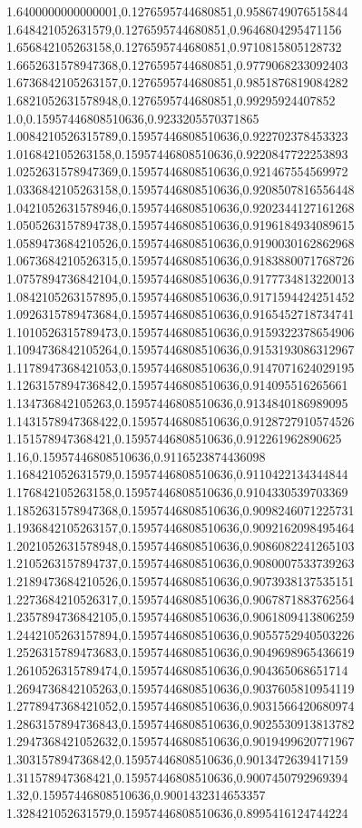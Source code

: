 1.6400000000000001,0.1276595744680851,0.9586749076515844
1.648421052631579,0.1276595744680851,0.9646804295471156
1.656842105263158,0.1276595744680851,0.9710815805128732
1.6652631578947368,0.1276595744680851,0.9779068233092403
1.6736842105263157,0.1276595744680851,0.9851876819084282
1.6821052631578948,0.1276595744680851,0.99295924407852
1.0,0.15957446808510636,0.9233205570371865
1.0084210526315789,0.15957446808510636,0.922702378453323
1.016842105263158,0.15957446808510636,0.9220847722253893
1.0252631578947369,0.15957446808510636,0.921467554569972
1.0336842105263158,0.15957446808510636,0.9208507816556448
1.0421052631578946,0.15957446808510636,0.9202344127161268
1.0505263157894738,0.15957446808510636,0.9196184934089615
1.0589473684210526,0.15957446808510636,0.9190030162862968
1.0673684210526315,0.15957446808510636,0.9183880071768726
1.0757894736842104,0.15957446808510636,0.9177734813220013
1.0842105263157895,0.15957446808510636,0.9171594424251452
1.0926315789473684,0.15957446808510636,0.9165452718734741
1.1010526315789473,0.15957446808510636,0.9159322378654906
1.1094736842105264,0.15957446808510636,0.9153193086312967
1.1178947368421053,0.15957446808510636,0.9147071624029195
1.1263157894736842,0.15957446808510636,0.914095516265661
1.134736842105263,0.15957446808510636,0.9134840186989095
1.1431578947368422,0.15957446808510636,0.9128727910574526
1.151578947368421,0.15957446808510636,0.912261962890625
1.16,0.15957446808510636,0.9116523874436098
1.168421052631579,0.15957446808510636,0.9110422134344844
1.176842105263158,0.15957446808510636,0.9104330539703369
1.1852631578947368,0.15957446808510636,0.9098246071225731
1.1936842105263157,0.15957446808510636,0.9092162098495464
1.2021052631578948,0.15957446808510636,0.9086082241265103
1.2105263157894737,0.15957446808510636,0.9080007533739263
1.2189473684210526,0.15957446808510636,0.9073938137535151
1.2273684210526317,0.15957446808510636,0.9067871883762564
1.2357894736842105,0.15957446808510636,0.9061809413806259
1.2442105263157894,0.15957446808510636,0.9055752940503226
1.2526315789473683,0.15957446808510636,0.9049698965436619
1.2610526315789474,0.15957446808510636,0.904365068651714
1.2694736842105263,0.15957446808510636,0.9037605810954119
1.2778947368421052,0.15957446808510636,0.9031566420680974
1.2863157894736843,0.15957446808510636,0.9025530913813782
1.2947368421052632,0.15957446808510636,0.9019499620771967
1.303157894736842,0.15957446808510636,0.9013472639417159
1.311578947368421,0.15957446808510636,0.9007450792969394
1.32,0.15957446808510636,0.9001432314653357
1.328421052631579,0.15957446808510636,0.8995416124744224

